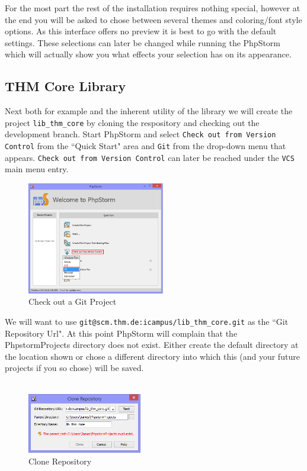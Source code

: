 \documentclass[]{report}
\begin{document}
\noindent
For the most part the rest of the installation requires nothing special, however at the end you will be asked to chose between several themes and coloring/font style options. As this interface offers no preview it is best to go with the default settings. These selections can later be changed while running the PhpStorm which will actually show you what effects your selection has on its appearance.

\subsection{THM Core Library}

Next both for example and the inherent utility of the library we will create the project \texttt{lib\_thm\_core} by cloning the respository and checking out the development branch. Start PhpStorm and select \texttt{Check out from Version Control} from the ``Quick Start" area and \texttt{Git} from the drop-down menu that appears. \texttt{Check out from Version Control} can later be reached under the \texttt{VCS} main menu entry.

\begin{figure}[h] 
	\centering
	\includegraphics[width=6cm]{newprojectfromgit.png}
	\caption{Check out a Git Project}
\end{figure}

\newpage

\noindent
We will want to use \texttt{git@scm.thm.de:icampus/lib\_thm\_core.git} as the ``Git Repository Url". At this point PhpStorm will complain that the PhpstormProjects directory does not exist. Either create the default directory at the location shown or chose a different directory into which this (and your future projects if you so chose) will be saved.\\
\\
\begin{figure}[h] 
	\centering
	\includegraphics[width=5cm]{clonerepositoryerror.png}
	\caption{Clone Repository}
\end{figure}
\end{document}
